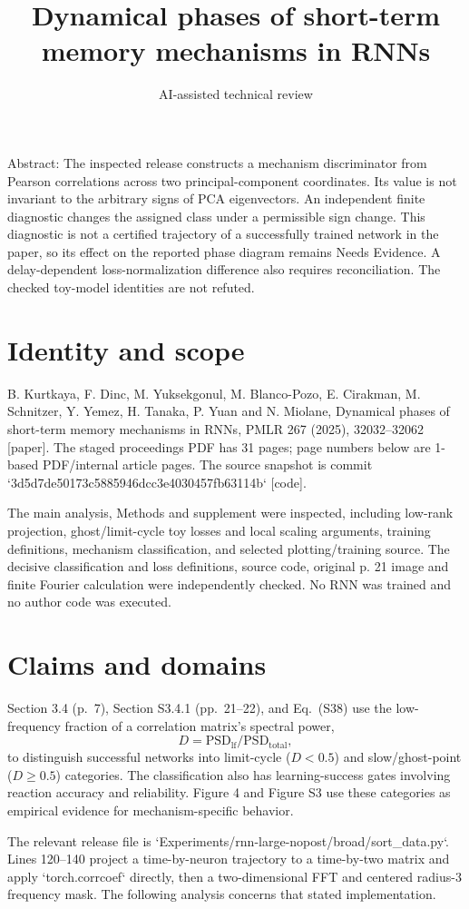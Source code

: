 \documentclass[10pt]{article}
\title{Dynamical phases of short-term memory mechanisms in RNNs}
\author{AI-assisted technical review}
\date{}
\begin{document}
\maketitle
Abstract: The inspected release constructs a mechanism discriminator from Pearson correlations across two principal-component coordinates. Its value is not invariant to the arbitrary signs of PCA eigenvectors. An independent finite diagnostic changes the assigned class under a permissible sign change. This diagnostic is not a certified trajectory of a successfully trained network in the paper, so its effect on the reported phase diagram remains Needs Evidence. A delay-dependent loss-normalization difference also requires reconciliation. The checked toy-model identities are not refuted.\par
\section*{Identity and scope}
B. Kurtkaya, F. Dinc, M. Yuksekgonul, M. Blanco-Pozo, E. Cirakman, M. Schnitzer, Y. Yemez, H. Tanaka, P. Yuan and N. Miolane, Dynamical phases of short-term memory mechanisms in RNNs, PMLR 267 (2025), 32032–32062 [paper]. The staged proceedings PDF has 31 pages; page numbers below are 1-based PDF/internal article pages. The source snapshot is commit `3d5d7de50173c5885946dcc3e4030457fb63114b` [code].\par
The main analysis, Methods and supplement were inspected, including low-rank projection, ghost/limit-cycle toy losses and local scaling arguments, training definitions, mechanism classification, and selected plotting/training source. The decisive classification and loss definitions, source code, original p. 21 image and finite Fourier calculation were independently checked. No RNN was trained and no author code was executed.\par
\section*{Claims and domains}
Section 3.4 (p. 7), Section S3.4.1 (pp. 21–22), and Eq. (S38) use the low-frequency fraction of a correlation matrix’s spectral power, \[D=\mathrm{PSD}_{\mathrm{lf}}/\mathrm{PSD}_{\mathrm{total}},\] to distinguish successful networks into limit-cycle (\(D<0.5\)) and slow/ghost-point (\(D\geq0.5\)) categories. The classification also has learning-success gates involving reaction accuracy and reliability. Figure 4 and Figure S3 use these categories as empirical evidence for mechanism-specific behavior.\par
The relevant release file is `Experiments/rnn-large-nopost/broad/sort\_data.py`. Lines 120–140 project a time-by-neuron trajectory to a time-by-two matrix and apply `torch.corrcoef` directly, then a two-dimensional FFT and centered radius-3 frequency mask. The following analysis concerns that stated implementation.\par
\end{document}
